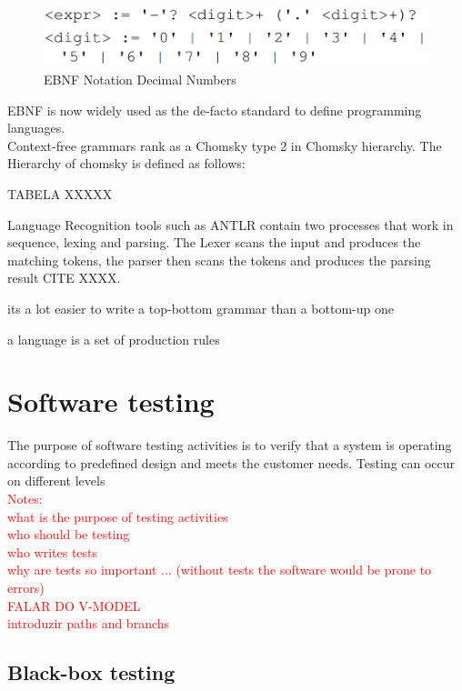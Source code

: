 \begin{figure}[H]
    \centering
    \includegraphics[scale=0.5]{images/EBNF.PNG}
    \caption{EBNF Notation Decimal Numbers}
    \label{fig:ebnf}
\end{figure}

EBNF is now widely used as the de-facto standard to define programming languages.\\

Context-free grammars rank as a Chomsky type 2 in Chomsky hierarchy. The Hierarchy of chomsky is defined as follows:

TABELA XXXXX



Language Recognition tools such as ANTLR contain two processes that work in sequence, lexing and parsing. The Lexer scans the input and produces the matching tokens, the parser then scans the tokens and produces the parsing result CITE XXXX.

its a lot easier to write a top-bottom grammar than a bottom-up one

a language is a set of production rules





\section{Software testing}
\label{sec:software_testing}

The purpose of software testing activities is to verify that a system is operating according to predefined design and meets the customer needs.
Testing can occur on different levels 
\\
\textcolor{red}{
Notes:\\
what is the purpose of testing activities\\
who should be testing\\
who writes tests\\
why are tests so important ... (without tests the software would be prone to errors)\\
FALAR DO V-MODEL\\
introduzir paths and branchs
}


\subsection{Black-box testing}
\label{subsec:black-box testing}

